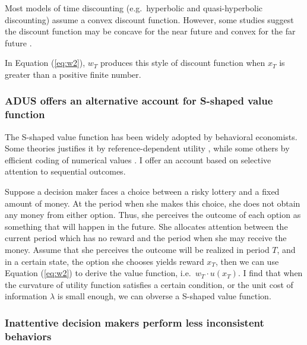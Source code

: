 \documentclass[
  12pt,
]{article}
\begin{document}
Most models of time discounting (e.g.~hyperbolic and quasi-hyperbolic
discounting) assume a convex discount function. However, some studies
suggest the discount function may be concave for the near future and
convex for the far future
\citep{onay_intertemporal_2007, takeuchi_non-parametric_2011, dejarnette_time_2020}.

In Equation (\ref{eq:w2}), \(w_T\) produces this style of discount
function when \(x_T\) is greater than a positive finite number.

\hypertarget{adus-offers-an-alternative-account-for-s-shaped-value-function}{%
\subsubsection{ADUS offers an alternative account for S-shaped value
function}\label{adus-offers-an-alternative-account-for-s-shaped-value-function}}

The S-shaped value function has been widely adopted by behavioral
economists. Some theories justifies it by reference-dependent utility
\citep{kahneman_prospect_1979, koszegi_model_2006}, while some others by
efficient coding of numerical values \citep{frydman_efficient_2021}. I
offer an account based on selective attention to sequential outcomes.

Suppose a decision maker faces a choice between a risky lottery and a
fixed amount of money. At the period when she makes this choice, she
does not obtain any money from either option. Thus, she perceives the
outcome of each option as something that will happen in the future. She
allocates attention between the current period which has no reward and
the period when she may receive the money. Assume that she perceives the
outcome will be realized in period \(T\), and in a certain state, the
option she chooses yields reward \(x_T\), then we can use Equation
(\ref{eq:w2}) to derive the value function, i.e.~\(w_T\cdot u(x_T)\). I
find that when the curvature of utility function satisfies a certain
condition, or the unit cost of information \(\lambda\) is small enough,
we can obverse a S-shaped value function.

\hypertarget{inattentive-decision-makers-perform-less-inconsistent-behaviors}{%
\subsubsection{Inattentive decision makers perform less inconsistent
behaviors}\label{inattentive-decision-makers-perform-less-inconsistent-behaviors}}
\end{document}
